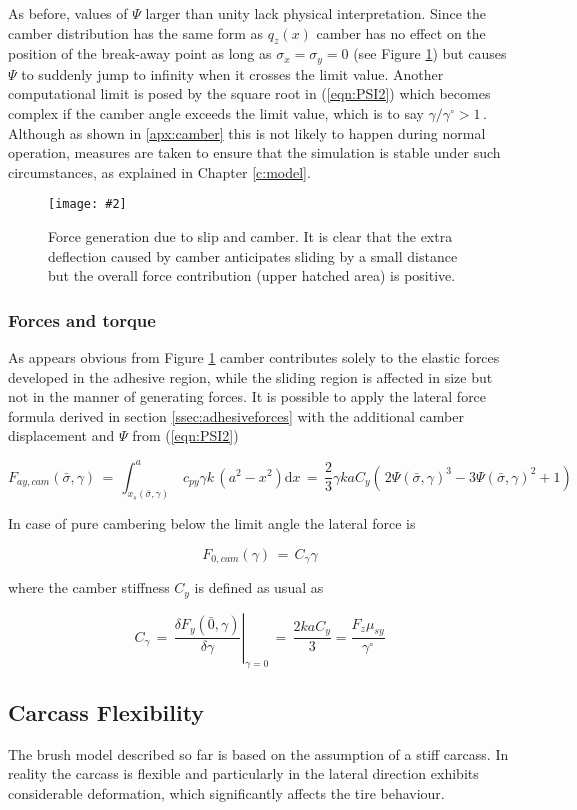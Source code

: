 \documentclass[12pt,a4paper]{report}
\newcommand{\figura}[5][htbp]{
\begin{figure}[#1]
\begin{center}
\texttt{[image: \#2]}
\caption{#4}\label{#5}
\end{center}
\end{figure}
}
\newcommand{\eq}[2]{
\begin{equation} \label{#1}
#2
\end{equation}
}
\newcommand{\req}[1]{
(\ref{#1})
}
\newcommand{\de}[1]{
\mathrm{d} #1 
}
\begin{document}
As before, values of $\Psi$ larger than unity lack physical interpretation. 
Since the camber distribution has the same form as $q_z(x)$ camber has no effect on the position of the break-away point as long as $\sigma_x = \sigma_y = 0$ (see Figure \ref{fig:sliparabolacam}) but causes $\Psi$ to suddenly jump to infinity when it crosses the limit value. 
Another computational limit is posed by the square root in \req{eqn:PSI2} which becomes complex if the camber angle exceeds the limit value, which is to say $\gamma / \gamma^\circ > 1 \,$.
Although as shown in \ref{apx:camber} this is not likely to happen during normal operation, measures are taken to ensure that the simulation is stable under such circumstances, as explained in Chapter \ref{c:model}.

\figura{pix/sliparabolacam.jpg}{width=12cm}{Force generation due to slip and camber. It is clear that the extra deflection caused by camber anticipates sliding by a small distance but the overall force contribution (upper hatched area) is positive.}{fig:sliparabolacam}


\subsubsection*{Forces and torque}
As appears obvious from Figure \ref{fig:sliparabolacam} camber contributes solely to the elastic forces developed in the adhesive region, while the sliding region is affected in size but not in the manner of generating forces.
It is possible to apply the lateral force formula derived in section \ref{ssec:adhesiveforces} with the additional camber displacement and $\Psi$ from \req{eqn:PSI2}
\eq{eqn:faycam}{F_{ay,cam}(\bar{\sigma},\gamma) \, = \, \int_{x_s(\bar{\sigma},\gamma)}^{a} \, c_{py} \gamma k \,(a^2- x^2) \de{x} \, = \,
										\frac{2}{3}\gamma k a C_{y} \left( \frac{}{} 2\Psi(\bar{\sigma},\gamma)^3 -3\Psi(\bar{\sigma},\gamma)^2 +1\right)}

In case of pure cambering below the limit angle the lateral force is
\eq{eqn:f0cam}{F_{0,cam}(\gamma) \, = \, C_\gamma \gamma}
where the camber stiffness $C_y$ is defined as usual as
\eq{camstiff}{C_\gamma \, = \, \left. \frac{\delta F_y(\bar{0},\gamma)}{\delta \gamma} \right|_{\gamma=0} \, = \, \frac{2kaC_y}{3} = \frac{F_z \mu_{sy}}{\gamma^\circ}}


\subsection{Carcass Flexibility}
The brush model described so far is based on the assumption of a stiff carcass.
In reality the carcass is flexible and particularly in the lateral direction exhibits considerable deformation, which significantly affects the tire behaviour.
\end{document}
